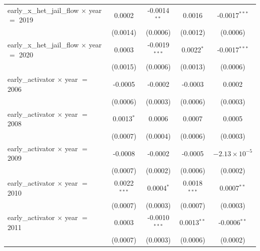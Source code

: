 \begin{tabular}{lcccc}
   early\_x\_het\_jail\_flow $\times$ year $=$ 2019      & 0.0002                 & -0.0014$^{**}$            & 0.0016                 & -0.0017$^{***}$\\   
                                                         & (0.0014)               & (0.0006)                  & (0.0012)               & (0.0006)\\   
   early\_x\_het\_jail\_flow $\times$ year $=$ 2020      & 0.0003                 & -0.0019$^{***}$           & 0.0022$^{*}$           & -0.0017$^{***}$\\   
                                                         & (0.0015)               & (0.0006)                  & (0.0013)               & (0.0006)\\   
   early\_activator $\times$ year $=$ 2006               & -0.0005                & -0.0002                   & -0.0003                & 0.0002\\   
                                                         & (0.0006)               & (0.0003)                  & (0.0006)               & (0.0003)\\   
   early\_activator $\times$ year $=$ 2008               & 0.0013$^{*}$           & 0.0006                    & 0.0007                 & 0.0005\\   
                                                         & (0.0007)               & (0.0004)                  & (0.0006)               & (0.0003)\\   
   early\_activator $\times$ year $=$ 2009               & -0.0008                & -0.0002                   & -0.0005                & $-2.13\times 10^{-5}$\\    
                                                         & (0.0007)               & (0.0002)                  & (0.0006)               & (0.0002)\\   
   early\_activator $\times$ year $=$ 2010               & 0.0022$^{***}$         & 0.0004$^{*}$              & 0.0018$^{***}$         & 0.0007$^{**}$\\   
                                                         & (0.0007)               & (0.0003)                  & (0.0007)               & (0.0003)\\   
   early\_activator $\times$ year $=$ 2011               & 0.0003                 & -0.0010$^{***}$           & 0.0013$^{**}$          & -0.0006$^{**}$\\   
                                                         & (0.0007)               & (0.0003)                  & (0.0006)               & (0.0002)\\   

\end{tabular}

